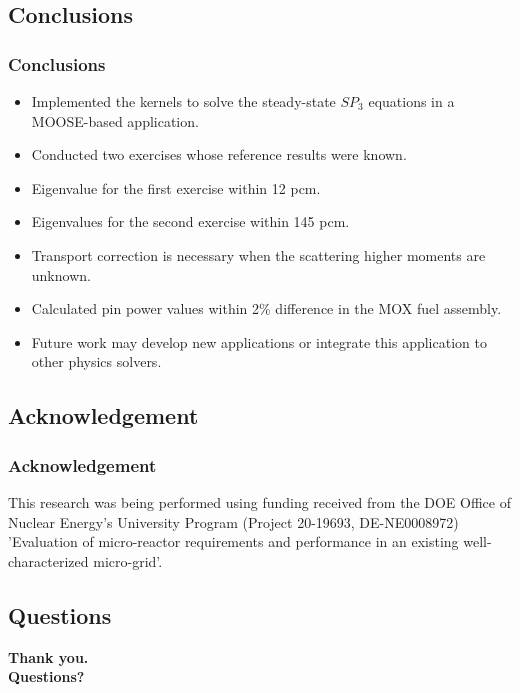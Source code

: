 \subsection{Conclusions}

\begin{frame}
\frametitle{Conclusions}

	\begin{itemize}
        \item Implemented the kernels to solve the steady-state $SP_3$ equations in a MOOSE-based application.
        \item Conducted two exercises whose reference results were known.
		\item Eigenvalue for the first exercise within 12 pcm.
		\item Eigenvalues for the second exercise within 145 pcm.
		\item Transport correction is necessary when the scattering higher moments are unknown.
		\item Calculated pin power values within 2\% difference in the MOX fuel assembly.
        \item Future work may develop new applications or integrate this application to other physics solvers.
    \end{itemize}
\end{frame}


\subsection{Acknowledgement}

\begin{frame}
\frametitle{Acknowledgement}

This research was being performed using funding received from the DOE Office of Nuclear Energy’s University Program (Project 20-19693, DE-NE0008972) ’Evaluation of micro-reactor requirements and performance in an existing well-characterized micro-grid’.

\end{frame}


\subsection{Questions}

\begin{frame}
  \begin{center}
    \Huge{\textbf{Thank you.\\ Questions?}}
  \end{center}
\end{frame}
